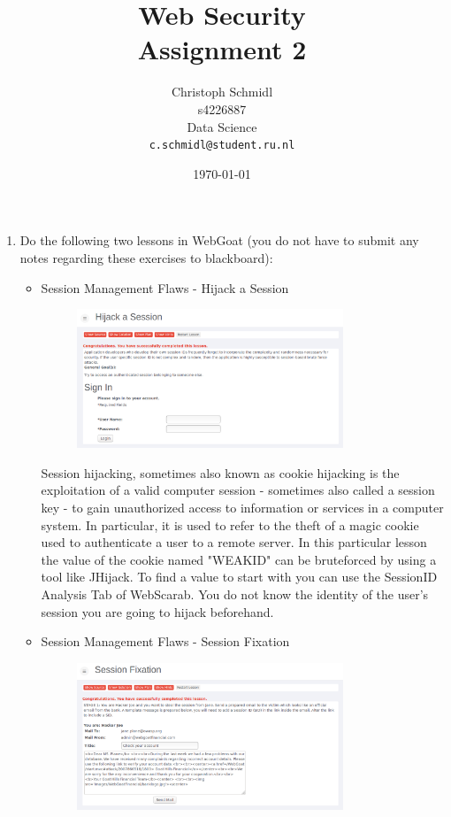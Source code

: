 \documentclass[a4paper]{article}
\title{Web Security\\Assignment 2}
\author{
  Christoph Schmidl\\ s4226887\\ Data Science\\      \texttt{c.schmidl@student.ru.nl}
}
\date{\today}
\begin{document}
\maketitle

\begin{enumerate}

\item Do the following two lessons in WebGoat (you do not have to submit any notes regarding these exercises to blackboard):

	\begin{itemize}
		\item Session Management Flaws - Hijack a Session
		
		\begin{figure}[H]
	    \centering
  	    \includegraphics[width=0.8\textwidth]{img/hijack_a_session_screen.PNG}
	    \end{figure}	
	    
	    Session hijacking, sometimes also known as cookie hijacking is the exploitation of a valid computer session - sometimes also called a session key - to gain unauthorized access to information or services in a computer system. In particular, it is used to refer to the theft of a magic cookie used to authenticate a user to a remote server. In this particular lesson the value of the cookie named "WEAKID" can be bruteforced by using a tool like JHijack. To find a value to start with you can use the SessionID Analysis Tab of WebScarab. You do not know the identity of the user's session you are going to hijack beforehand.\\
	    
		\item Session Management Flaws - Session Fixation
		
		\begin{figure}[H]
	    \centering
  	    \includegraphics[width=0.8\textwidth]{img/session_fixation_screen.PNG}
	    \end{figure}	
	\end{itemize}


\end{enumerate}
\end{document}
